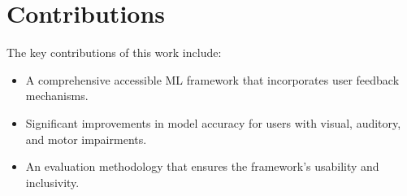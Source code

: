 \documentclass{article}
\begin{document}
\section{Contributions}
\label{sec:contributions}

The key contributions of this work include:
\begin{itemize}
    \item A comprehensive accessible ML framework that incorporates user feedback mechanisms.
    \item Significant improvements in model accuracy for users with visual, auditory, and motor impairments.
    \item An evaluation methodology that ensures the framework's usability and inclusivity.
\end{itemize}

\end{document}
